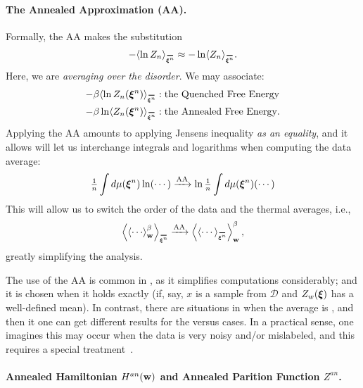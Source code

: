 \paragraph{The Annealed Approximation (AA).} 
Formally, the AA makes the substitution
\begin{align}
\label{eqn:AA}
-\langle\ln Z_{\ND}\rangle_{\AVGNDXIn}\approx-\ln \langle Z_{\ND}\rangle_{\AVGNDXIn}.
\end{align}
Here, we are \emph{averaging over the disorder}.
We may associate: 
\begin{eqnarray*}
    -\beta\langle\ln Z_{\ND}(\NDXIn)\rangle_{\AVGNDXIn} &: \mbox{the \Quenched \FreeEnergy} \\
    -\beta\ln \langle Z_{\ND}(\NDXIn)\rangle_{\AVGNDXIn} &: \mbox{the \Annealed \FreeEnergy}.
\end{eqnarray*}
Applying the AA amounts to applying Jensens inequality \emph{as an equality}, 
and it allows will let us interchange integrals and logarithms when computing the data average:
\begin{align}
\label{eqn:Jensens}
\tfrac{1}{n}\int d\mu(\boldsymbol{\xi}^{n})\ln(\cdots)   
\xrightarrow {\text{AA}}
\ln\tfrac{1}{n}\int d\mu(\boldsymbol{\xi}^{n})(\cdots)
\end{align}
This will allow us to switch the order of the data and the thermal averages, i.e.,
\begin{align}
\label{eqn:switch}
\left\langle \THRMAVGw{\cdots} \right\rangle_{\AVGNDXIn}
\xrightarrow{\text{AA}}
\THRMAVGw{\left\langle \cdots \right\rangle_{\AVGNDXIn}},
\end{align}
greatly simplifying the analysis.

The use of the AA is common in \STATMECH, as it simplifies computations considerably; and 
it is chosen when it holds exactly (if, say, $x$ is a \Typical sample from $\mathcal{D}$ and $Z_w(\boldsymbol{\xi})$ has a well-defined mean).
In contrast, there are situations in \STATMECH when the average is \ATypical, and then it one can get different results for the \Quenched versus \Annealed cases.  In a practical sense, one imagines this may occur when the data is very
noisy and/or mislabeled, and this requires a special treatment~\cite{SST92}.

\paragraph{Annealed Hamiltonian $H^{an}({\mathbf{w}})$ and Annealed Parition Function $Z^{an}$.}

